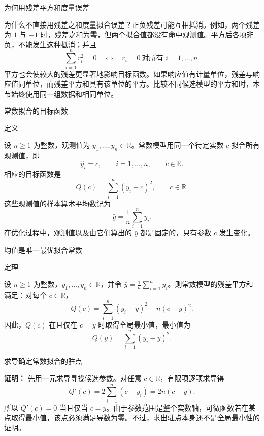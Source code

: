 \documentclass[aspectratio=169,10pt,fontset=fandol]{ctexbeamer}
\begin{document}
\begin{frame}[t,fragile]{为何用残差平方和度量误差}
\footnotesize
{\footnotesize
为什么不直接用残差之和度量拟合误差？正负残差可能互相抵消。例如，两个残差为 $1$ 与 $-1$ 时，残差之和为零，但两个拟合值都没有命中观测值。平方后各项非负，不能发生这种抵消；并且
\[
\sum_{i=1}^{n}r_i^2=0\quad\Longleftrightarrow\quad r_i=0\ \text{对所有 }i=1,\ldots,n.
\]
平方也会使较大的残差更显著地影响目标函数。如果响应值有计量单位，残差与响应值同单位，而残差平方和具有该单位的平方。比较不同候选模型的平方和时，本节始终使用同一组数据和相同单位。\par

}
\end{frame}
\begin{frame}[t,fragile]{常数拟合的目标函数}
\footnotesize
\begin{block}{定义}
{\footnotesize
设 $n\geq1$ 为整数，观测值为 $y_1,\ldots,y_n\in\mathbb{R}$。常数模型用同一个待定实数 $c$ 拟合所有观测值，即
\[
\hat{y}_i=c,\qquad i=1,\ldots,n,\qquad c\in\mathbb{R}.
\]
相应的目标函数是
\[
Q(c)=\sum_{i=1}^{n}(y_i-c)^2,\qquad c\in\mathbb{R}.
\]
这些观测值的样本算术平均数记为
\[
\bar{y}=\frac{1}{n}\sum_{i=1}^{n}y_i.
\]
在优化过程中，观测值以及由它们算出的 $\bar{y}$ 都是固定的，只有参数 $c$ 发生变化。

}
\end{block}
\end{frame}
\begin{frame}[t,fragile]{均值是唯一最优拟合常数}
\footnotesize
\begin{block}{定理}
{\footnotesize
设 $n\geq1$ 为整数，$y_1,\ldots,y_n\in\mathbb{R}$，并令 $\bar{y}=\frac{1}{n}\sum_{i=1}^{n}y_i$。则常数模型的残差平方和满足：对每个 $c\in\mathbb{R}$，
\[
Q(c)=\sum_{i=1}^{n}(y_i-\bar{y})^2+n(c-\bar{y})^2.
\]
因此，$Q(c)$ 在且仅在 $c=\bar{y}$ 时取得全局最小值，最小值为
\[
Q(\bar{y})=\sum_{i=1}^{n}(y_i-\bar{y})^2.
\]

}
\end{block}
\end{frame}
\begin{frame}[t,fragile]{求导确定常数拟合的驻点}
\footnotesize
{\footnotesize
\textbf{证明：}
先用一元求导寻找候选参数。对任意 $c\in\mathbb{R}$，有限项逐项求导得
\[
Q'(c)=2\sum_{i=1}^{n}(c-y_i)=2n(c-\bar{y}).
\]
所以 $Q'(c)=0$ 当且仅当 $c=\bar{y}$。由于参数范围是整个实数轴，可微函数若在某点取得最小值，该点必须满足导数为零。不过，求出驻点本身还不是全局最小性的证明。


}
\end{frame}
\end{document}
